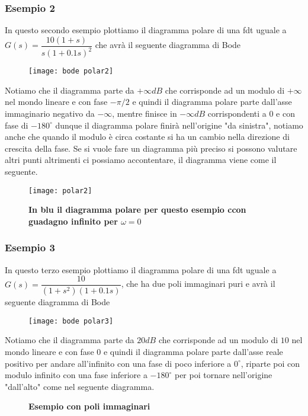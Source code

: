 \documentclass[a4paper]{article}
\begin{document}
	\subsubsection*{Esempio 2}
	In questo secondo esempio plottiamo il diagramma polare di una fdt uguale a\\ $ G(s)=\dfrac{10(1+s)}{s(1+0.1s)^2} $ che avrà il seguente diagramma di Bode
	\begin{figure}[H]
		\centering
		\texttt{[image: bode polar2]}
	\end{figure}
	Notiamo che il diagramma parte da $ +\infty dB $ che corrisponde ad un modulo di  $ +\infty $ nel mondo lineare e con fase $ -\pi/2 $ e quindi il diagramma polare parte dall'asse immaginario negativo da $ -\infty $, mentre finisce in $ -\infty dB $ corrispondenti a $ 0 $ e con fase di $ -180^{\circ} $ dunque il diagramma polare finirà nell'origine "da sinistra", notiamo anche che quando il modulo è circa costante si ha un cambio nella direzione di crescita della fase. Se si vuole fare un diagramma più preciso si possono valutare altri punti altrimenti ci possiamo accontentare, il diagramma viene come il seguente.
	\begin{figure}[H]
		\centering
		\texttt{[image: polar2]}
		\caption{\textbf{In blu il diagramma polare per questo esempio ccon guadagno infinito per $ \omega=0 $}}		
	\end{figure}
	
		\subsubsection*{Esempio 3}
	In questo terzo esempio plottiamo il diagramma polare di una fdt uguale a\\ $ G(s)=\dfrac{10}{(1+s^2)(1+0.1s)} $, che ha due poli immaginari puri e avrà il seguente diagramma di Bode
	\begin{figure}[H]
		\centering
		\texttt{[image: bode polar3]}
	\end{figure}
	Notiamo che il diagramma parte da $ 20 dB $ che corrisponde ad un modulo di  $ 10 $ nel mondo lineare e con fase $ 0 $ e quindi il diagramma polare parte dall'asse reale positivo per andare all'infinito con una fase di poco inferiore a $ 0^{\circ} $, riparte poi con modulo infinito con una fase inferiore a $ -180^{\circ} $ per poi tornare nell'origine "dall'alto" come nel seguente diagramma.

	\begin{figure}[H]
		\centering
		\qquad %
		\caption{\textbf{Esempio con poli immaginari}}
	\end{figure}
	
\end{document}
